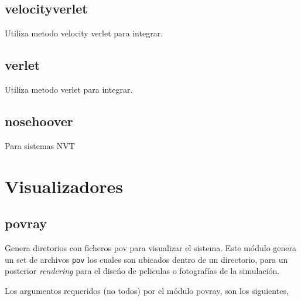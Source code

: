 \subsection{velocityverlet}
Utiliza metodo velocity verlet para integrar.
\subsection{verlet}
Utiliza metodo verlet para integrar.
\subsection{nosehoover}
Para sistemas NVT

\section{Visualizadores}
\subsection{povray}
Genera diretorios con ficheros pov para visualizar el sistema. Este m\'odulo genera un set de archivos \verb|pov| los cuales son ubicados dentro de un directorio, para un posterior \textit{rendering} para el dise\'no de peliculas o fotograf\'ias de la simulaci\'on.

Los argumentos requeridos (no todos) por el m\'odulo povray, son los siguientes,


